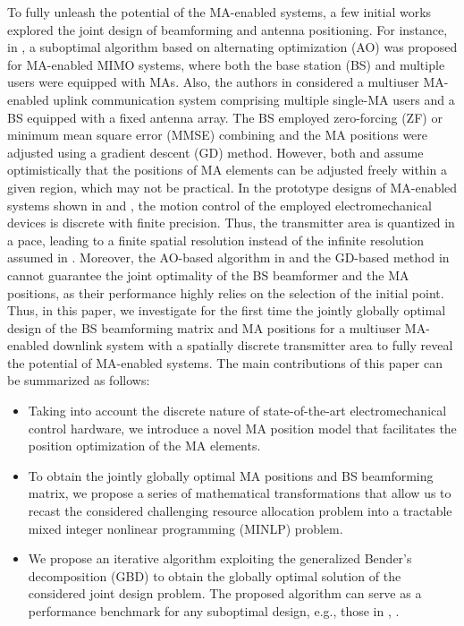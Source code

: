 \documentclass[12pt, draftclsnofoot, onecolumn]{IEEEtran}
\begin{document}
To fully unleash the potential of the MA-enabled systems, a few initial works explored the joint design of beamforming and antenna positioning. For instance, in \cite{ma2022mimo}, a suboptimal algorithm based on alternating optimization (AO) was proposed for MA-enabled MIMO systems, where both the base station (BS) and multiple users were equipped with MAs. Also, the authors in \cite{zhu2023movable} considered a multiuser MA-enabled uplink communication system comprising multiple single-MA users and a BS equipped with a fixed antenna array. The BS employed zero-forcing (ZF) or minimum mean square error (MMSE) combining and the MA positions were adjusted using a gradient descent (GD) method. However, both \cite{ma2022mimo} and \cite{zhu2023movable} assume optimistically that the positions of MA elements can be adjusted freely within a given region, which may not be practical. In the prototype designs of MA-enabled systems shown in \cite{zhuravlev2015experimental} and \cite{basbug2017design}, the motion control of the employed electromechanical devices is discrete with finite precision. Thus, the transmitter area is quantized in a pace\cite{basbug2017design}, leading to a finite spatial resolution instead of the infinite resolution assumed in \cite{zhu2022modeling,ma2022mimo,zhu2023movable}. Moreover, the AO-based algorithm in \cite{ma2022mimo} and the GD-based method in \cite{zhu2023movable} cannot guarantee the joint optimality of the BS beamformer and the MA positions, as their performance highly relies on the selection of the initial point. Thus, in this paper, we investigate for the first time the jointly globally optimal design of the BS beamforming matrix and MA positions for a multiuser MA-enabled downlink system with a spatially discrete transmitter area to fully reveal the potential of MA-enabled systems. The main contributions of this paper can be summarized as follows:
\begin{itemize}
\item Taking into account the discrete nature of state-of-the-art electromechanical control hardware, we introduce a novel MA position model that facilitates the position optimization of the MA elements.
\item To obtain the jointly globally optimal MA positions and BS beamforming matrix, we propose a series of mathematical transformations that allow us to recast the considered challenging resource allocation problem into a tractable mixed integer nonlinear programming (MINLP) problem.
\item We propose an iterative algorithm exploiting the generalized Bender's decomposition (GBD) to obtain the globally optimal solution of the considered joint design problem. The proposed algorithm can serve as a performance benchmark for any suboptimal design, e.g., those in \cite{ma2022mimo}, \cite{zhu2023movable}.
\end{itemize}
\end{document}
